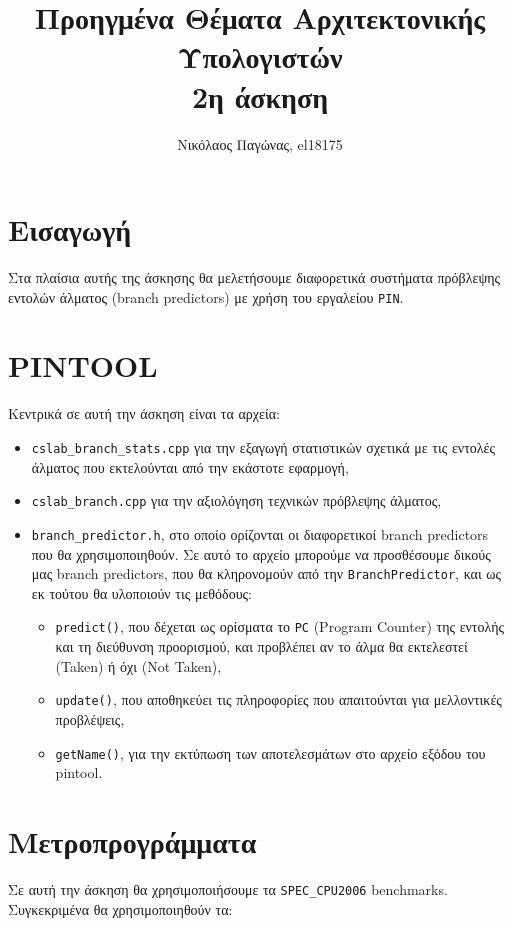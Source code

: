 \documentclass[12pt,a4paper]{article}
\title{Προηγμένα Θέματα Αρχιτεκτονικής Υπολογιστών \\ 2η άσκηση}
\author{Νικόλαος Παγώνας, el18175}
\date{}
\begin{document}
	\maketitle	
	
	\section{Εισαγωγή}
		Στα πλαίσια αυτής της άσκησης θα μελετήσουμε διαφορετικά συστήματα πρόβλεψης εντολών άλματος (branch predictors) με χρήση του εργαλείου \verb|PIN|.
	
	\section{PINTOOL}
		Κεντρικά σε αυτή την άσκηση είναι τα αρχεία:
		
		\begin{itemize}
			\item \verb|cslab_branch_stats.cpp| για την εξαγωγή στατιστικών σχετικά με τις εντολές άλματος που εκτελούνται από την εκάστοτε εφαρμογή,
			\item \verb|cslab_branch.cpp| για την αξιολόγηση τεχνικών πρόβλεψης άλματος,
			\item \verb|branch_predictor.h|, στο οποίο ορίζονται οι διαφορετικοί branch predictors που θα χρησιμοποιηθούν. Σε αυτό το αρχείο μπορούμε να προσθέσουμε δικούς μας branch predictors, που θα κληρονομούν από την \verb|BranchPredictor|, και ως εκ τούτου θα υλοποιούν τις μεθόδους:
			
			\begin{itemize}
				\item \verb|predict()|, που δέχεται ως ορίσματα το \verb|PC| (Program Counter) της εντολής και τη διεύθυνση προορισμού, και προβλέπει αν το άλμα θα εκτελεστεί (Taken) ή όχι (Not Taken),
				\item \verb|update()|, που αποθηκεύει τις πληροφορίες που απαιτούνται για μελλοντικές προβλέψεις,
				\item \verb|getName()|, για την εκτύπωση των αποτελεσμάτων στο αρχείο εξόδου του pintool.
			\end{itemize}
		\end{itemize}
	
	\section{Μετροπρογράμματα}
		Σε αυτή την άσκηση θα χρησιμοποιήσουμε τα \verb|SPEC_CPU2006| benchmarks. Συγκεκριμένα θα χρησιμοποιηθούν τα:
		
\end{document}
